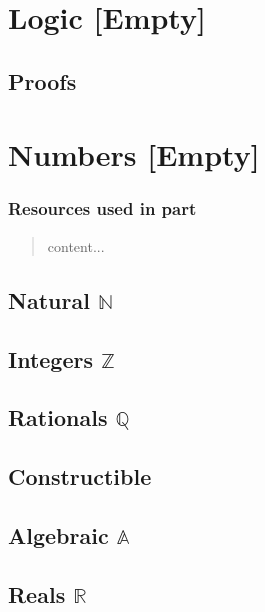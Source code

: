 \documentclass[12pt, english]{book}
\newenvironment{partintro}
{\vspace*{\fill}
	\section*{\centering Resources used in part \thepart}
	\begin{quotation}}
	{\end{quotation}\vspace*{\fill}\newpage}
\begin{document}
	
	\section*{}
	\tableofcontents
	
	\mainmatter
	\part{Logic [Empty]} \label{Logic Part}
	
	\chapter{Proofs}
	
	
	\part{Numbers [Empty]} \label{Numbers Part}
	\begin{partintro}
		content...
	\end{partintro}
	
	\chapter{Natural \texorpdfstring{\(\mathbb{N}\)}{TEXT}} \label{Natural Chapter - Numbers}
	
	\chapter{Integers \texorpdfstring{\(\mathbb{Z}\)}{TEXT}} \label{Integers Chapter - Numbers}
	
	\chapter{Rationals \texorpdfstring{\(\mathbb{Q}\)}{TEXT}} \label{Rationals Chapter - Numebers}
	
	\chapter{Constructible} \label{Constructible Chapter - Numbers}
	
	\chapter{Algebraic \texorpdfstring{\(\mathbb{A}\)}{TEXT}} \label{Algebraic Chapter - Numbers}
	
	\chapter{Reals \texorpdfstring{\(\mathbb{R}\)}{TEXT}} \label{Reals Chapter - Numbers}
	
\end{document}
